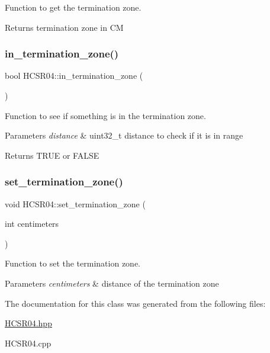 Function to get the termination zone. 

\begin{DoxyReturn}{Returns}
termination zone in CM 
\end{DoxyReturn}
\mbox{\label{class_h_c_s_r04_aa96fffeea68bcb19249ffaf763520ed4}} 
\subsubsection{\texorpdfstring{in\+\_\+termination\+\_\+zone()}{in\_termination\_zone()}}
{\footnotesize\ttfamily bool H\+C\+S\+R04\+::in\+\_\+termination\+\_\+zone (\begin{DoxyParamCaption}{ }\end{DoxyParamCaption})}



Function to see if something is in the termination zone. 


\begin{DoxyParams}{Parameters}
{\em distance} & uint32\+\_\+t distance to check if it is in range \\
\hline
\end{DoxyParams}
\begin{DoxyReturn}{Returns}
T\+R\+UE or F\+A\+L\+SE 
\end{DoxyReturn}
\mbox{\label{class_h_c_s_r04_aebbf05553e7818475e4846422088806e}} 
\subsubsection{\texorpdfstring{set\+\_\+termination\+\_\+zone()}{set\_termination\_zone()}}
{\footnotesize\ttfamily void H\+C\+S\+R04\+::set\+\_\+termination\+\_\+zone (\begin{DoxyParamCaption}\item[{int}]{centimeters }\end{DoxyParamCaption})}



Function to set the termination zone. 


\begin{DoxyParams}{Parameters}
{\em centimeters} & distance of the termination zone \\
\hline
\end{DoxyParams}


The documentation for this class was generated from the following files\+:\begin{DoxyCompactItemize}
\item 
\hyperlink{_h_c_s_r04_8hpp}{H\+C\+S\+R04.\+hpp}\item 
H\+C\+S\+R04.\+cpp\end{DoxyCompactItemize}
